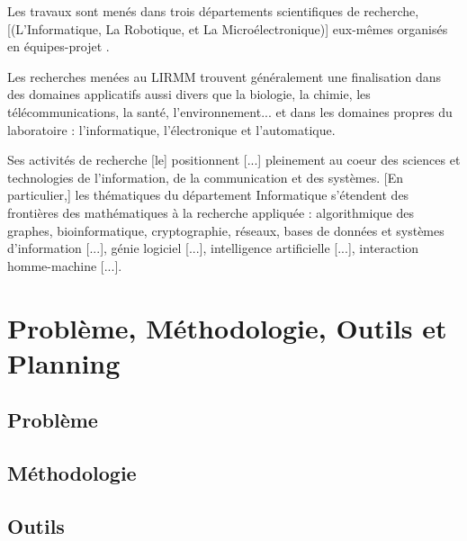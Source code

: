 \documentclass[a4paper,12pt]{book}
\theoremstyle{break}
\theoremstyle{break}
\theoremstyle{definition}
\theoremstyle{remark}
\begin{document}
Les travaux sont menés dans trois départements scientifiques de recherche, [(L’Informatique, La Robotique, et La Microélectronique)] eux-mêmes organisés en \og équipes-projet \fg{}.

Les recherches menées au LIRMM trouvent généralement une finalisation dans des domaines applicatifs aussi divers que la biologie, la chimie, les télécommunications, la santé, l'environnement... et dans les domaines propres du laboratoire : l'informatique, l'électronique et l'automatique.

Ses activités de recherche [le] positionnent [...] pleinement au coeur des sciences et technologies de l’information, de la communication et des systèmes. [En particulier,] les thématiques du département Informatique s’étendent des frontières des mathématiques à la recherche appliquée : algorithmique des graphes, bioinformatique, cryptographie, réseaux, bases de données et systèmes d'information [...], génie logiciel [...], intelligence artificielle [...], interaction homme-machine [...]. \fg{} \citep{lirmmPres}

\chapter{Problème, Méthodologie, Outils et Planning}
\section{Problème}

\section{Méthodologie}

\section{Outils}
\end{document}
